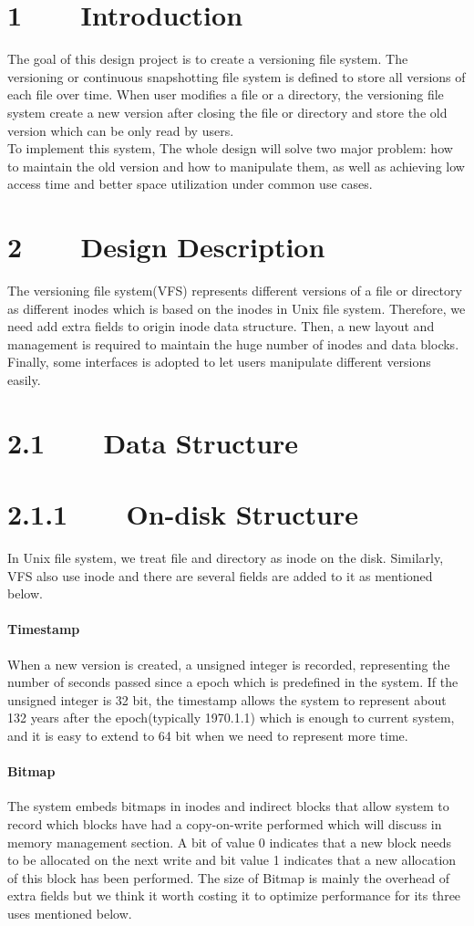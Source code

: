 \section*{1~~~~Introduction}The goal of this design project is to create a versioning file system. The versioning or continuous snapshotting file system is defined to store all versions of each file over time. When user modifies a file or  a directory, the versioning file system create a new version after closing the file or directory and store the old version which can be only read by users. \\[1em]To implement this system, The whole design will solve two major problem: how to maintain the old version and how to manipulate them, as well as achieving low access time and better space utilization under common use cases.
\section*{2~~~~Design Description}
The versioning file system(VFS) represents different versions of a file or directory as different inodes which is based on the inodes in Unix file system. Therefore, we need add extra fields to origin inode data structure. Then, a new layout and management is required to maintain the huge number of inodes and data blocks. Finally, some interfaces is adopted to let users manipulate different versions easily.
\section*{2.1~~~~Data Structure}
\section*{2.1.1~~~~On-disk Structure}
In Unix file system, we treat file and directory as inode on the disk. Similarly, VFS also use inode and there are several fields are added to it as mentioned below. 
\paragraph{Timestamp}When a new version is created, a unsigned integer is recorded, representing the number of seconds passed since a epoch which is predefined in the system. If the unsigned integer is 32 bit, the timestamp allows the system to represent about 132 years after the epoch(typically 1970.1.1) which is enough to current system, and it is easy to extend to 64 bit when we need to represent more time. 
\paragraph{Bitmap}The system embeds bitmaps in inodes and indirect blocks that allow system to record which blocks have had a copy-on-write performed which will discuss in memory management section. A bit of value 0 indicates that a new block needs to be allocated on the next write and bit value 1 indicates that a new allocation of this block has been performed. The size of Bitmap is mainly the overhead of extra fields but we think it worth costing it to optimize performance for its three uses mentioned below.
